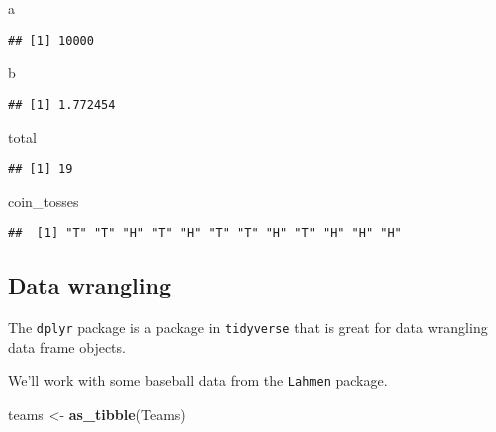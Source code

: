 \documentclass[
]{article}
\newenvironment{Shaded}{\begin{snugshade}}{\end{snugshade}}
\newcommand{\KeywordTok}[1]{\textcolor[rgb]{0.13,0.29,0.53}{\textbf{#1}}}
\newcommand{\NormalTok}[1]{#1}
\newcommand{\StringTok}[1]{\textcolor[rgb]{0.31,0.60,0.02}{#1}}
\begin{document}
\begin{Shaded}
\begin{Highlighting}[]
\NormalTok{a}
\end{Highlighting}
\end{Shaded}

\begin{verbatim}
## [1] 10000
\end{verbatim}

\begin{Shaded}
\begin{Highlighting}[]
\NormalTok{b}
\end{Highlighting}
\end{Shaded}

\begin{verbatim}
## [1] 1.772454
\end{verbatim}

\begin{Shaded}
\begin{Highlighting}[]
\NormalTok{total}
\end{Highlighting}
\end{Shaded}

\begin{verbatim}
## [1] 19
\end{verbatim}

\begin{Shaded}
\begin{Highlighting}[]
\NormalTok{coin_tosses}
\end{Highlighting}
\end{Shaded}

\begin{verbatim}
##  [1] "T" "T" "H" "T" "H" "T" "T" "H" "T" "H" "H" "H"
\end{verbatim}

\hypertarget{data-wrangling}{%
\subsection{Data wrangling}\label{data-wrangling}}

The \texttt{dplyr} package is a package in \texttt{tidyverse} that is
great for data wrangling data frame objects.

We'll work with some baseball data from the \texttt{Lahmen} package.

\begin{Shaded}
\begin{Highlighting}[]
\NormalTok{teams <-}\StringTok{ }\KeywordTok{as_tibble}\NormalTok{(Teams)}
\end{Highlighting}
\end{Shaded}
\end{document}
